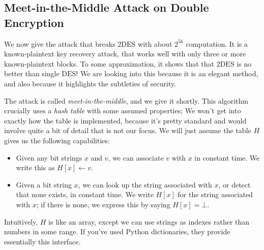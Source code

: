\documentclass[11pt]{article}
\newcommand{\des}{\mathrm{DES}}
\newcommand{\twodes}{\mathrm{2DES}}
\begin{document}
\subsection{Meet-in-the-Middle Attack on Double Encryption}

We now give the attack that breaks $\twodes$ with about $2^{56}$ computation.
It is a known-plaintext key recovery attack, that works well with only three or
more known-plaintext blocks. To some approximation, it shows that that 
$\twodes$ is no better than single $\des$! We are looking into this because
it is an elegant method, and also because it highlights the subtleties of
security.

The attack is called \emph{meet-in-the-middle}, and we give it shortly.  This
algorithm crucially uses a \emph{hash table} with some assumed properties; We
won't get into exactly how the table is implemented, because it's pretty
standard and would involve quite a bit of detail that is not our focus.
We will just assume the table $H$ gives us the following capabilities:
\begin{itemize}
    \item Given any bit strings $x$ and $v$, we can associate $v$ with
        $x$ in constant time. We write this as
        $H[x] \gets v$.
    \item Given a bit string $x$, we can look up the string associated with
        $x$, or detect that none exists, in constant time.  We write $H[x]$ for
        the string associated with $x$; if there is none, we express this by
        saying $H[x] = \bot$.
\end{itemize}
Intuitively, $H$ is like an array, except we can use strings as indexes rather
than numbers in some range. If you've used Python dictionaries, they provide
essentially this interface.
\end{document}

